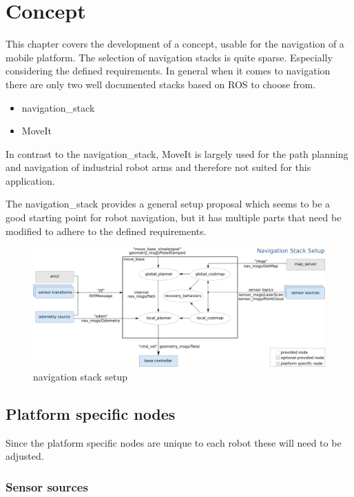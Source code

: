 \chapter{Concept}
\label{Concept}

This chapter covers the development of a concept, usable for the navigation of a mobile platform. 
The selection of navigation stacks is quite sparse. Especially considering the defined requirements. In general when it comes to navigation there are only two well documented stacks based on ROS to choose from.

\begin{itemize}
	\item navigation\_stack
	\item MoveIt
\end{itemize}

In contrast to the navigation\_stack, MoveIt is largely used for the path planning and navigation of industrial robot arms and therefore not suited for this application.

The navigation\_stack provides a general setup proposal which seems to be a good starting point for robot navigation, but it has multiple parts that need be modified to adhere to the defined requirements.

\begin{figure}[H]
	\centering
	\includegraphics[width=\textwidth]{Pictures/navigation stack setup}
	\caption{navigation stack setup\cite{movebase}}
	
	\label{navigation stack setup}
\end{figure}


\section{Platform specific nodes}
Since the platform specific nodes are unique to each robot these will need to be adjusted.\\
\subsection{Sensor sources}

